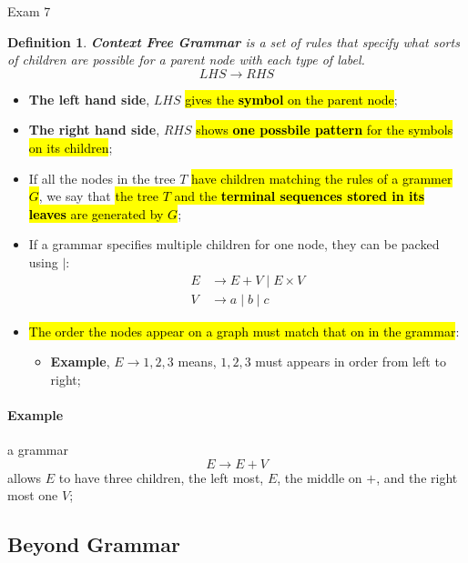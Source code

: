 \documentclass{note}
\newtheorem{definition}{Definition}
\begin{document}
\begin{note}{Exam 7}
    \begin{definition}
        \textbf{Context Free Grammar} is a set of rules that specify what sorts of children are possible for a parent node
        with each type of label.
        \begin{displaymath}
            LHS \to RHS
        \end{displaymath}
    \end{definition}
    \begin{itemize}
        \item \textbf{The left hand side}, $ LHS $ \hl{gives the \textbf{symbol} on the parent node};
        \item \textbf{The right hand side}, $ RHS $ \hl{shows \textbf{one possbile pattern} for the symbols on its children};
        \item If all the nodes in the tree $ T $ \hl{have children matching the rules of a grammer $ G $}, we say that 
        \hl{the tree $ T $ and the \textbf{terminal sequences stored in its leaves} are generated by $ G $};
        \item If a grammar specifies multiple children for one node, they can be packed using $ \mid $:
        \begin{align*}
            E &\to E + V \mid E \times V \\
            V &\to a \mid b \mid c
        \end{align*}
        \item \hl{The order the nodes appear on a graph must match that on in the grammar}:
        \begin{itemize}
            \item \textbf{Example}, $ E \to 1,2,3 $ means, $ 1,2,3 $ must appears in order from left to right;
        \end{itemize}
    \end{itemize}

    \paragraph{Example}a grammar
    \begin{displaymath}
        E \to E + V
    \end{displaymath}
    allows $ E $ to have three children, the left most, $ E $, the middle on $ + $,
    and the right most one $ V $;

    \subsection{Beyond Grammar}


\end{note}
\end{document}
